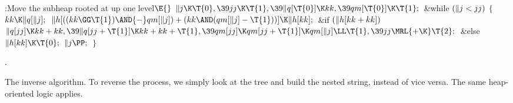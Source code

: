 \Y\B\4:Move the subheap rooted at  up one level\X${}\E{}$\6
$\|j\K\T{0},\39\\{jj}\K\T{1},\39\|q[\T{0}]\K\\{kk},\39\\{qm}[\T{0}]\K\T{1};{}$\6
\&{while} ${}(\|j<\\{jj}){}$\5
${}\{{}$\1\6
${}\\{kk}\K\|q[\|j];{}$\6
${}\|h[((\\{kk}\GG\T{1})\AND{-}\\{qm}[\|j])+(\\{kk}\AND(\\{qm}[\|j]-\T{1}))]\K%
\|h[\\{kk}];{}$\6
\&{if} ${}(\|h[\\{kk}+\\{kk}]){}$\1\5
${}\|q[\\{jj}]\K\\{kk}+\\{kk},\39\|q[\\{jj}+\T{1}]\K\\{kk}+\\{kk}+\T{1},\39%
\\{qm}[\\{jj}]\K\\{qm}[\\{jj}+\T{1}]\K\\{qm}[\|j]\LL\T{1},\39\\{jj}\MRL{+{\K}}%
\T{2};{}$\2\6
\&{else}\1\5
${}\|h[\\{kk}]\K\T{0};{}$\2\6
${}\|j\PP;{}$\6
\4${}\}{}$\2\par
{}.\fi

The inverse algorithm. To reverse the process, we simply
look at the
tree and build the nested string, instead of vice versa. The same
heap-oriented logic applies.

